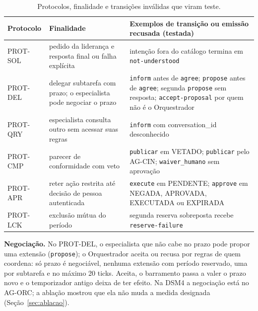 \documentclass[10pt,a4paper]{article}
\newcommand{\code}[1]{\texttt{#1}}
\newenvironment{tabela}[1]{\begin{table}[H]\centering\footnotesize\renewcommand{\arraystretch}{1.1}\caption{#1}}{\end{table}}
\begin{document}
\begin{tabela}{Protocolos, finalidade e transições inválidas que viram teste.\label{tab:prot}}
\begin{tabularx}{\linewidth}{L{1.5cm} L{5.2cm} Y}
\toprule
\textbf{Protocolo} & \textbf{Finalidade} & \textbf{Exemplos de transição ou emissão recusada (testada)}\\ \midrule
PROT-SOL & pedido da liderança e resposta final ou falha explícita & intenção fora do catálogo termina em \code{not-understood} \\
PROT-DEL & delegar subtarefa com prazo; o especialista pode negociar o prazo & \code{inform} antes de \code{agree}; \code{propose} antes de \code{agree}; segunda \code{propose} sem resposta; \code{accept-proposal} por quem não é o Orquestrador \\
PROT-QRY & especialista consulta outro sem acessar suas regras & \code{inform} com conversation\_id desconhecido \\
PROT-CMP & parecer de conformidade com veto & \code{publicar} em VETADO; \code{publicar} pelo AG-CIN; \code{waiver\_humano} sem aprovação \\
PROT-APR & reter ação restrita até decisão de pessoa autenticada & \code{execute} em PENDENTE; \code{approve} em NEGADA, APROVADA, EXECUTADA ou EXPIRADA \\
PROT-LCK & exclusão mútua do período & segunda reserva sobreposta recebe \code{reserve-failure} \\
\bottomrule
\end{tabularx}
\end{tabela}

\textbf{Negociação.} No PROT-DEL, o especialista que não cabe no prazo pode propor uma extensão
(\code{propose}); o Orquestrador aceita ou recusa por regras de quem coordena: só prazo é negociável, nenhuma extensão
com período reservado, uma por subtarefa e no máximo 20 ticks. Aceita, o barramento passa a valer o prazo novo e o
temporizador antigo deixa de ter efeito. Na DSM4 a negociação está no AG-ORC; a ablação mostrou que ela não muda a
medida designada (Seção~\ref{sec:ablacao}).
\end{document}
